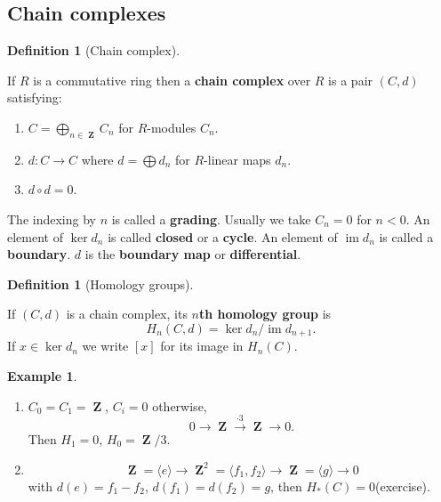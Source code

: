 \documentclass[10pt,]{book}
\newcommand{\lt}{<}
\newcommand{\terminology}[1]{\textbf{#1}}
\theoremstyle{plain}
\theoremstyle{definition}
\newtheorem{definition}[theorem]{Definition}
\newtheorem{example}[theorem]{Example}
\numberwithin{equation}{section}
\DeclareMathOperator{\im}{im}
\DeclareMathOperator{\ZZ}{\mathbf{Z}}
\begin{document}
\subsection[Chain complexes]{Chain complexes}\label{subsection-3}
\begin{definition}[Chain complex]\label{definition-6}

              If \(R\) is a commutative ring then a \terminology{chain complex} over \(R\) is a pair \((C,d)\) satisfying:
              \begin{enumerate}
\item{}\(C = \bigoplus_{n\in\ZZ} C_n\) for \(R\)-modules \(C_n\).\item{}\(d\colon C \to C\) where \(d = \bigoplus d_n\) for \(R\)-linear maps \(d_n\).\item{}\(d\circ d = 0\).\end{enumerate}

              The indexing by \(n\) is called a \terminology{grading}.
              Usually we take \(C_n = 0\) for \(n \lt 0\).
              An element of \(\ker d_n\) is called \terminology{closed} or a \terminology{cycle}.
              An element of \(\im d_n\) is called a \terminology{boundary}.
              \(d\) is the \terminology{boundary map} or \terminology{differential}.
            \end{definition}
\begin{definition}[Homology groups]\label{definition-7}

              If \((C,d)\) is a chain complex, its \terminology{\(n\)th homology group} is
              \[H_n(C,d) = \ker d_n/\im d_{n+1}.\]
              If \(x \in \ker d_n\) we write \([x]\) for its image in \(H_n(C)\).
            \end{definition}
\begin{example}\label{example-4}
\begin{enumerate}
\item{}
                \(C_0 = C_1 = \ZZ\), \(C_i = 0\) otherwise,
                \[
                  0\to \ZZ \xrightarrow{\cdot 3} \ZZ \to 0.
                \]
                Then \(H_1 = 0\), \(H_0 = \ZZ/3\).
              \item{}
                \[
                  \ZZ=\langle e\rangle\to\ZZ^2 = \langle f_1,f_2\rangle\to\ZZ=\langle g\rangle \to 0
                \]
                with \(d(e) = f_1-f_2\), \(d(f_1) = d(f_2) = g\), then \(H_*(C) = 0\)(exercise).
              \end{enumerate}
\end{example}
\typeout{************************************************}
\typeout{************************************************}
\end{document}
